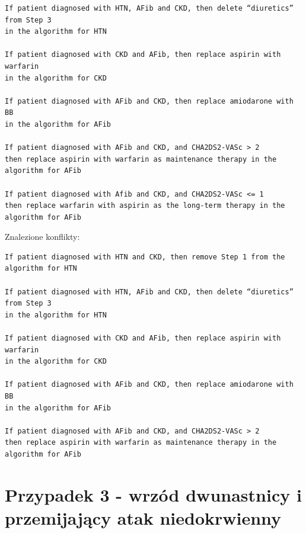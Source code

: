 \documentclass[oneside,a4paper]{book}
\begin{document}
\begin{spacing}{1.5}
\begin{verbatim}
If patient diagnosed with HTN, AFib and CKD, then delete “diuretics” from Step 3 
in the algorithm for HTN

If patient diagnosed with CKD and AFib, then replace aspirin with warfarin 
in the algorithm for CKD

If patient diagnosed with AFib and CKD, then replace amiodarone with BB 
in the algorithm for AFib

If patient diagnosed with AFib and CKD, and CHA2DS2-VASc > 2
then replace aspirin with warfarin as maintenance therapy in the algorithm for AFib

If patient diagnosed with Afib and CKD, and CHA2DS2-VASc <= 1
then replace warfarin with aspirin as the long-term therapy in the algorithm for AFib
\end{verbatim}
Znalezione konflikty:
\begin{verbatim}
If patient diagnosed with HTN and CKD, then remove Step 1 from the algorithm for HTN

If patient diagnosed with HTN, AFib and CKD, then delete “diuretics” from Step 3
in the algorithm for HTN

If patient diagnosed with CKD and AFib, then replace aspirin with warfarin 
in the algorithm for CKD

If patient diagnosed with AFib and CKD, then replace amiodarone with BB 
in the algorithm for AFib

If patient diagnosed with AFib and CKD, and CHA2DS2-VASc > 2
then replace aspirin with warfarin as maintenance therapy in the algorithm for AFib
\end{verbatim}
\newpage
\section{Przypadek 3 - wrzód dwunastnicy i przemijający atak niedokrwienny}


\end{spacing}
\end{document}
